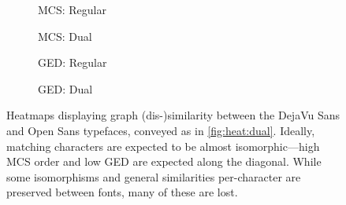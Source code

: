 \documentclass{mpaper}
\begin{document}
\begin{figure}
	\centering
	\begin{subfigure}[b]{0.225\linewidth}
		
		\caption{MCS: Regular\label{fig:heat:sans:mcs-r}}
	\end{subfigure}
	\begin{subfigure}[b]{0.225\linewidth}
		
		\caption{MCS: Dual\label{fig:heat:sans:mcs-d}}
	\end{subfigure}
	\begin{subfigure}[b]{0.225\linewidth}
		
		\caption{GED: Regular\label{fig:heat:sans:ged-r}}
	\end{subfigure}
	\begin{subfigure}[b]{0.225\linewidth}
		
		\caption{GED: Dual\label{fig:heat:sans:ged-d}}
	\end{subfigure}
	
	\vspace{0.5em}
	\caption{
		Heatmaps displaying graph (dis-)similarity between the DejaVu Sans and Open Sans typefaces, conveyed as in \cref{fig:heat:dual}.
		Ideally, matching characters are expected to be almost isomorphic---high MCS order and low GED are expected along the diagonal.
		While some isomorphisms and general similarities per-character are preserved between fonts, many of these are lost.
		\label{fig:heat:sans}
	}
\end{figure}
\end{document}
